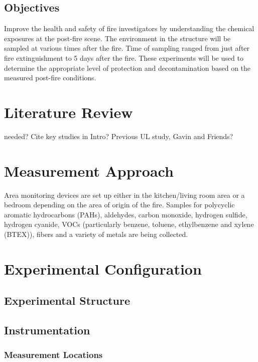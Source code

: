 \documentclass[12pt,oneside]{book}
\begin{document}
\section{Objectives}

Improve the health and safety of fire investigators by understanding the chemical exposures at the post-fire scene.  The environment in the structure will be sampled at various times after the fire. Time of sampling ranged from just after fire extinguishment to 5 days after the fire.  These experiments will be used to determine the appropriate level of protection and decontamination based on the measured post-fire conditions.       


\chapter{Literature Review}
\label{chap:lit_review}

needed?   Cite key studies in Intro?  Previous UL study, Gavin and Friends? 

\chapter{Measurement Approach}

Area monitoring devices are set up either in the kitchen/living room area or a bedroom depending on the area of origin of the fire.  Samples for polycyclic aromatic hydrocarbons (PAHs), aldehydes, carbon monoxide, hydrogen sulfide, hydrogen cyanide, VOCs (particularly benzene, toluene, ethylbenzene and xylene (BTEX)), fibers and a variety of metals are being collected.  

\chapter{Experimental Configuration}
\label{chap:exp_config}

\section{Experimental Structure}

\section{Instrumentation}
\label{sec:instrument}

\subsection{Measurement Locations}
\label{subsec:measure_locs}
\end{document}
